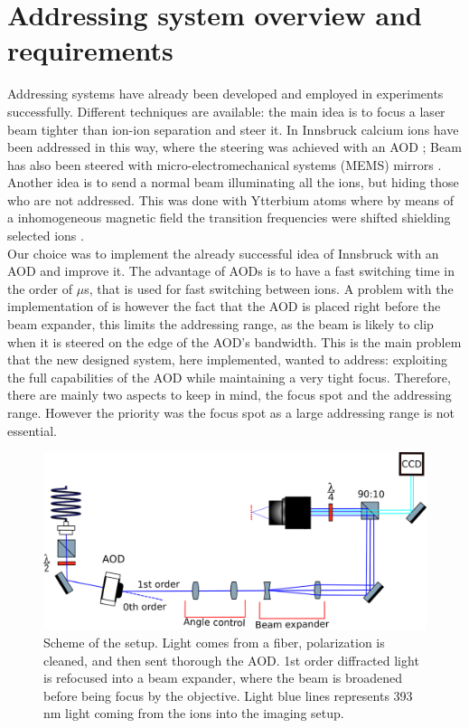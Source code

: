 \section{Addressing system overview and requirements}
Addressing systems have already been developed and employed in experiments successfully. Different techniques are available: the main idea is to focus a laser beam tighter than ion-ion separation and steer it. In  Innsbruck calcium ions have been addressed in this way, where the steering was achieved with an AOD \cite{addressing}; Beam has also been steered with micro-electromechanical systems (MEMS) mirrors \cite{addressing3}. Another idea is to send a normal beam illuminating all the ions, but hiding those who are not addressed. This was done with Ytterbium atoms where by means of a inhomogeneous magnetic field the transition frequencies were shifted shielding selected ions \cite{addressing2}. \\
Our choice was to implement the already successful idea of Innsbruck with an AOD and improve it. The advantage of AODs is to have a fast switching time in the order of $\mu$s, that is used for fast switching between ions. A problem with the implementation of \cite{addressing} is however the fact that the AOD is placed right before the beam expander, this limits the addressing range, as the beam is likely to clip when it is steered on the edge of the AOD's bandwidth. This is the main problem that the new designed system, here implemented, wanted to address: exploiting the full capabilities of the AOD while maintaining a very tight focus.
Therefore, there are mainly two aspects to keep in mind, the focus spot and the addressing range. However the priority was the focus spot as a large addressing range is not essential.
\begin{figure}[H]
\centering
\includegraphics[width=\textwidth]{img/setup}
\caption{Scheme of the setup. Light comes from a fiber, polarization is cleaned, and then sent thorough the AOD. 1st order diffracted light is refocused into a beam expander, where the beam is broadened before being focus by the objective. Light blue lines represents 393 nm light coming from the ions into the imaging setup.}
\label{addressingsetup}
\end{figure}
